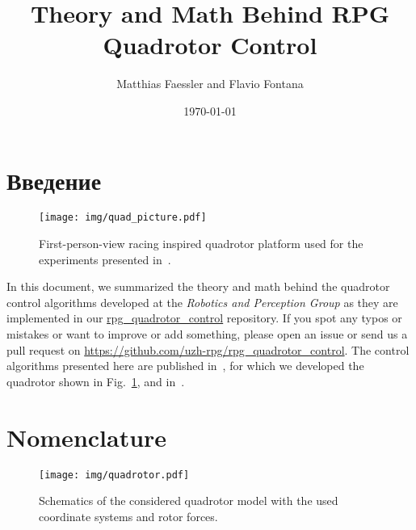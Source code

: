 \documentclass[12pt,a4paper,fleqn]{article}
\title{Theory and Math Behind RPG Quadrotor Control}
\author{
  Matthias Faessler and Flavio Fontana
}
\date{\today}
\begin{document}
\pagestyle{fancy}             %

\maketitle
\tableofcontents
\newpage


\section{Введение}

\begin{figure}[t]
   \centering
   \texttt{[image: img/quad\_picture.pdf]}
   \caption{First-person-view racing inspired quadrotor platform used for the experiments presented in~\cite{Faessler18ral}.}
   \label{fig:quad_picture}
\end{figure}

In this document, we summarized the theory and math behind the quadrotor control algorithms developed at the \emph{Robotics and Perception Group} as they are implemented in our \href{https://github.com/uzh-rpg/rpg_quadrotor_control}{rpg\_quadrotor\_control} repository.
If you spot any typos or mistakes or want to improve or add something, please open an issue or send us a pull request on \url{https://github.com/uzh-rpg/rpg_quadrotor_control}.
The control algorithms presented here are published in~\cite{Faessler18ral}, for which we developed the quadrotor shown in Fig.~\ref{fig:quad_picture}, and in~\cite{Faessler17ral}.

\section{Nomenclature} \label{sec:nomenclature}

\begin{figure}[h]
   \centering
   \texttt{[image: img/quadrotor.pdf]}
   \caption{Schematics of the considered quadrotor model with the used coordinate systems and rotor forces.}
   \label{fig:quad}
\end{figure}
\end{document}
